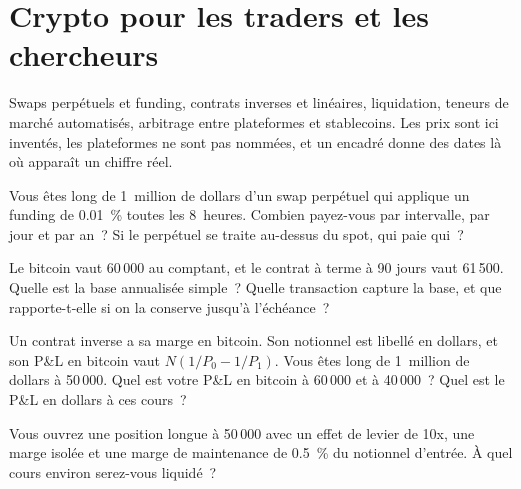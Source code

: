 \chapter{Crypto pour les traders et les chercheurs}\label{ch:iv2:crypto-for-traders-and-researchers}

\begin{ivtrains}
Swaps perpétuels et funding, contrats inverses et linéaires, liquidation, teneurs de marché automatisés, arbitrage entre plateformes et stablecoins. Les prix sont ici inventés, les plateformes ne sont pas nommées, et un encadré donne des dates là où apparaît un chiffre réel.
\end{ivtrains}

\begin{question}\label{iq:iv2:crypto-for-traders-and-researchers:1}
Vous êtes long de 1~million de dollars d'un swap perpétuel qui applique un funding de 0.01~\% toutes les 8~heures. Combien payez-vous par intervalle, par jour et par an~? Si le perpétuel se traite au-dessus du spot, qui paie qui~?
\end{question}

\begin{question}\label{iq:iv2:crypto-for-traders-and-researchers:2}
Le bitcoin vaut 60\,000 au comptant, et le contrat à terme à 90 jours vaut 61\,500. Quelle est la base annualisée simple~? Quelle transaction capture la base, et que rapporte-t-elle si on la conserve jusqu'à l'échéance~?
\end{question}

\begin{question}\label{iq:iv2:crypto-for-traders-and-researchers:3}
Un contrat inverse a sa marge en bitcoin. Son notionnel est libellé en dollars, et son P\&L en bitcoin vaut $N(1/P_0 - 1/P_1)$. Vous êtes long de 1~million de dollars à 50\,000. Quel est votre P\&L en bitcoin à 60\,000 et à 40\,000~? Quel est le P\&L en dollars à ces cours~?
\end{question}

\begin{question}\label{iq:iv2:crypto-for-traders-and-researchers:4}
Vous ouvrez une position longue à 50\,000 avec un effet de levier de 10x, une marge isolée et une marge de maintenance de 0.5~\% du notionnel d'entrée. À quel cours environ serez-vous liquidé~?
\end{question}

